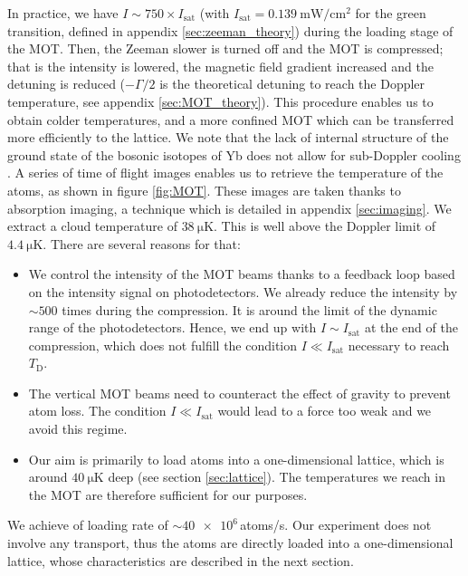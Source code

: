 \documentclass[11pt]{article}
\newcommand{\mathsc}[1]{\mathrm{\scriptscriptstyle {#1}}}
\numberwithin{equation}{section}
\numberwithin{figure}{section}
\begin{document}
In practice, we have $I \sim 750 \times I_\text{sat}$ (with $I_\text{sat} = \SI{0.139}{\milli\watt\per\centi\metre\squared}$ for the green transition, defined in appendix \ref{sec:zeeman_theory}) during the loading stage of the MOT. Then, the Zeeman slower is turned off and the MOT is compressed; that is the intensity is lowered, the magnetic field gradient increased and the detuning is reduced ($- \Gamma / 2$  is the theoretical detuning to reach the Doppler temperature, see appendix \ref{sec:MOT_theory}). This procedure enables us to obtain colder temperatures, and a more confined MOT which can be transferred more efficiently to the lattice. We note that the lack of internal structure of the ground state of the bosonic isotopes of Yb does not allow for sub-Doppler cooling \citep{2003_maruyama}.
A series of time of flight images enables us to retrieve the temperature of the atoms, as shown in figure \ref{fig:MOT}. These images are taken thanks to absorption imaging, a technique which is detailed in appendix \ref{sec:imaging}. We extract a cloud temperature of $\SI{38}{\micro\kelvin}$. This is well above the Doppler limit of $\SI{4.4}{\micro\kelvin}$. There are several reasons for that:
\begin{itemize}
	\item We control the intensity of the MOT beams thanks to a feedback loop based on the intensity signal on photodetectors. We already reduce the intensity by $\sim 500$ times during the compression. It is around the limit of the dynamic range of the photodetectors. Hence, we end up with $I \sim I_\text{sat}$ at the end of the compression, which does not fulfill the condition $I \ll I_\text{sat}$ necessary to reach $T_\mathsc{D}$.
	\item The vertical MOT beams need to counteract the effect of gravity to prevent atom loss. The condition $I \ll I_\text{sat}$ would lead to a force too weak and we avoid this regime.
	\item Our aim is primarily to load atoms into a one-dimensional lattice, which is around $\SI{40}{\micro\kelvin}$ deep (see section \ref{sec:lattice}). The temperatures we reach in the MOT are therefore sufficient for our purposes.
\end{itemize}
We achieve of loading rate of $\sim \num{40e6}\,$atoms/s. Our experiment does not involve any transport, thus the atoms are directly loaded into a one-dimensional lattice, whose characteristics are described in the next section.
\end{document}
